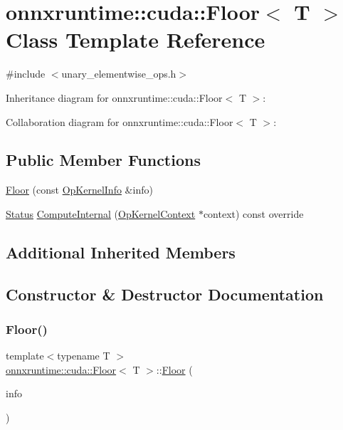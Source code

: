 \hypertarget{classonnxruntime_1_1cuda_1_1Floor}{}\section{onnxruntime\+:\+:cuda\+:\+:Floor$<$ T $>$ Class Template Reference}
\label{classonnxruntime_1_1cuda_1_1Floor}


{\ttfamily \#include $<$unary\+\_\+elementwise\+\_\+ops.\+h$>$}



Inheritance diagram for onnxruntime\+:\+:cuda\+:\+:Floor$<$ T $>$\+:


Collaboration diagram for onnxruntime\+:\+:cuda\+:\+:Floor$<$ T $>$\+:
\subsection*{Public Member Functions}
\begin{DoxyCompactItemize}
\item 
\mbox{\hyperlink{classonnxruntime_1_1cuda_1_1Floor_a1bf5465ebd595bdb4c74f91fe0ea1c2a}{Floor}} (const \mbox{\hyperlink{classonnxruntime_1_1OpKernelInfo}{Op\+Kernel\+Info}} \&info)
\item 
\mbox{\hyperlink{classonnxruntime_1_1common_1_1Status}{Status}} \mbox{\hyperlink{classonnxruntime_1_1cuda_1_1Floor_ad9062f3bb265d435c16206fa28ba4f4f}{Compute\+Internal}} (\mbox{\hyperlink{classonnxruntime_1_1OpKernelContext}{Op\+Kernel\+Context}} $\ast$context) const override
\end{DoxyCompactItemize}
\subsection*{Additional Inherited Members}


\subsection{Constructor \& Destructor Documentation}
\mbox{\label{classonnxruntime_1_1cuda_1_1Floor_a1bf5465ebd595bdb4c74f91fe0ea1c2a}} 
\subsubsection{\texorpdfstring{Floor()}{Floor()}}
{\footnotesize\ttfamily template$<$typename T $>$ \\
\mbox{\hyperlink{classonnxruntime_1_1cuda_1_1Floor}{onnxruntime\+::cuda\+::\+Floor}}$<$ T $>$\+::\mbox{\hyperlink{classonnxruntime_1_1cuda_1_1Floor}{Floor}} (\begin{DoxyParamCaption}\item[{const \mbox{\hyperlink{classonnxruntime_1_1OpKernelInfo}{Op\+Kernel\+Info}} \&}]{info }\end{DoxyParamCaption})\hspace{0.3cm}{\ttfamily [inline]}}



